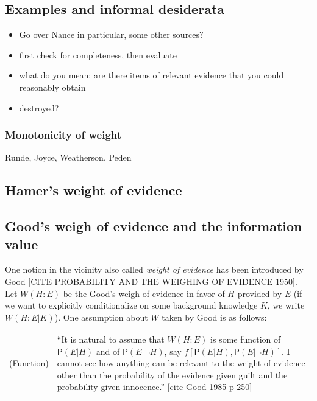 \documentclass[
  10pt,
  dvipsnames,enabledeprecatedfontcommands]{scrartcl}
\newcommand{\pr}[1]{\mathsf{P}(#1)}
\begin{document}
\hypertarget{examples-and-informal-desiderata}{%
\subsection{Examples and informal
desiderata}\label{examples-and-informal-desiderata}}

\begin{itemize}
\item
  Go over Nance in particular, some other sources?
\item
  first check for completeness, then evaluate
\item
  what do you mean: are there items of relevant evidence that you could
  reasonably obtain
\item
  destroyed?
\end{itemize}

\hypertarget{monotonicity-of-weight}{%
\subsubsection{Monotonicity of weight}\label{monotonicity-of-weight}}

Runde, Joyce, Weatherson, Peden

\hypertarget{hamers-weight-of-evidence}{%
\subsection{Hamer's weight of
evidence}\label{hamers-weight-of-evidence}}

\hypertarget{goods-weigh-of-evidence-and-the-information-value}{%
\subsection{Good's weigh of evidence and the information
value}\label{goods-weigh-of-evidence-and-the-information-value}}

One notion in the vicinity also called \emph{weight of evidence} has
been introduced by Good {[}CITE PROBABILITY AND THE WEIGHING OF EVIDENCE
1950{]}. Let \(W(H:E)\) be the Good's weigh of evidence in favor of
\(H\) provided by \(E\) (if we want to explicitly conditionalize on some
background knowledge \(K\), we write \(W(H:E\vert K)\)). One assumption
about \(W\) taken by Good is as
follows:

\begin{tabular}{lp{11cm}}
(Function) & ``It is natural to assume that $W(H:E)$ is some function of $\pr{E\vert H}$ and of $\pr{E\vert \neg H}$, say $f[\pr{E\vert H}, \pr{E \vert \neg H}]$. I cannot see how anything can be relevant to the weight of evidence other than the probability of the evidence given guilt and the probability given innocence.'' [cite Good 1985 p 250]
\end{tabular}
\end{document}
